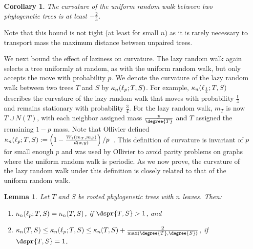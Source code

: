 \documentclass[11pt,onecolumn,conference]{IEEEtran}
\newtheorem{lemma}[theorem]{Lemma}
\newtheorem{corollary}[theorem]{Corollary}
\newcommand{\curvature}[2][]{%
    \ifthenelse{\equal{#1}{}}%
		{\kappa_n(#2)}%
		{\kappa_n(#1;#2)}%
}
\begin{document}
\begin{corollary}
	The curvature of the uniform random walk between two phylogenetic trees is at least $-\frac{2}{5}$.
\end{corollary}

Note that this bound is not tight (at least for small $n$) as it is rarely necessary to transport mass the maximum distance between unpaired trees.

We next bound the effect of laziness on curvature.
The lazy random walk again selects a tree uniformly at random, as with the uniform random walk, but only accepts the move with probability $p$.
We denote the curvature of the lazy random walk between two trees $T$ and $S$ by $\curvature[\ell_p]{T,S}$.
For example, $\curvature[\ell_{\frac{1}{4}}]{T,S}$ describes the curvature of the lazy random walk that moves with probability $\frac{1}{4}$ and remains stationary with probability $\frac{3}{4}$.
For the lazy random walk, $m_T$ is now $T \cup N(T)$, with each neighbor assigned mass $\frac{p}{\degree{T}}$ and $T$ assigned the remaining $1 - p$ mass.
Note that Ollivier defined $\curvature[\ell_p]{T, S} := \left(1 - \frac{W_1(m_T, m_S)}{d(x, y)}\right) / p$~\cite{Ollivier2009-bw}.
This definition of curvature is invariant of $p$ for small enough $p$ and was used by Ollivier to avoid parity problems on graphs where the uniform random walk is periodic.
As we now prove, the curvature of the lazy random walk under this definition is closely related to that of the uniform random walk.

\begin{lemma}
	Let $T$ and $S$ be rooted phylogenetic trees with $n$ leaves.
	Then:
	\begin{enumerate}
		\item	$\curvature[\ell_p]{T,S} = \curvature{T,S}$, if $\dspr{T,S} > 1$, and
		\item	$\curvature{T,S} \le \curvature[\ell_p]{T,S} \le \curvature{T,S} + \frac{2}{\max(\degree{T}, \degree{S})}$, if $\dspr{T,S} = 1$.
	\end{enumerate}
\end{lemma}
\end{document}
